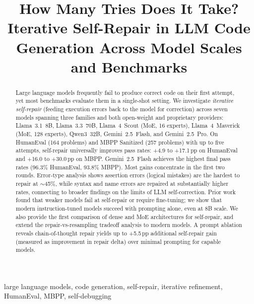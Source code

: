 \documentclass[conference]{IEEEtran}
\begin{document}
\title{How Many Tries Does It Take? Iterative Self-Repair in LLM Code Generation Across Model Scales and Benchmarks}

\author{
}

\maketitle

\begin{abstract}
Large language models frequently fail to produce correct code on their first attempt, yet most benchmarks evaluate them in a single-shot setting. We investigate \emph{iterative self-repair} (feeding execution errors back to the model for correction) across seven models spanning three families and both open-weight and proprietary providers: Llama~3.1~8B, Llama~3.3~70B, Llama~4~Scout (MoE, 16 experts), Llama~4~Maverick (MoE, 128 experts), Qwen3~32B, Gemini~2.5~Flash, and Gemini~2.5~Pro. On HumanEval (164 problems) and MBPP Sanitized (257 problems) with up to five attempts, self-repair universally improves pass rates: +4.9 to +17.1\,pp on HumanEval and +16.0 to +30.0\,pp on MBPP. Gemini~2.5~Flash achieves the highest final pass rates (96.3\% HumanEval, 93.8\% MBPP). Most gains concentrate in the first two rounds. Error-type analysis shows assertion errors (logical mistakes) are the hardest to repair at $\sim$45\%, while syntax and name errors are repaired at substantially higher rates, connecting to broader findings on the limits of LLM self-correction. Prior work found that weaker models fail at self-repair or require fine-tuning; we show that modern instruction-tuned models succeed with prompting alone, even at 8B scale. We also provide the first comparison of dense and MoE architectures for self-repair, and extend the repair-vs-resampling tradeoff analysis to modern models. A prompt ablation reveals chain-of-thought repair yields up to +5.5\,pp additional self-repair gain (measured as improvement in repair delta) over minimal prompting for capable models.
\end{abstract}

\begin{IEEEkeywords}
large language models, code generation, self-repair, iterative refinement, HumanEval, MBPP, self-debugging
\end{IEEEkeywords}

\end{document}
